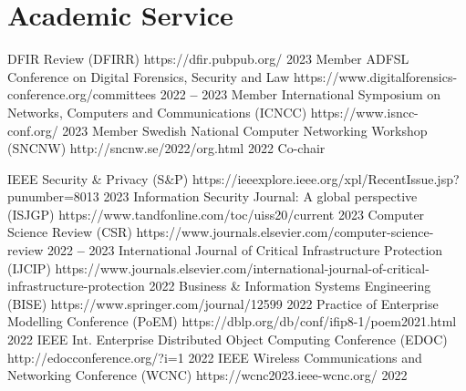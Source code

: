 
\section{Academic Service}
    
    
        
        \cvItem
            {DFIR Review (DFIRR)}
            {https://dfir.pubpub.org/}
            {2023}
            {Member}
            {}
        \cvItem
            {ADFSL Conference on Digital Forensics, Security and Law}
            {https://www.digitalforensics-conference.org/committees}
            {2022 \textbf{--} 2023}
            {Member}
            {}
        \cvItem
            {International Symposium on Networks, Computers and Communications (ICNCC)}
            {https://www.isncc-conf.org/}
            {2023}
            {Member}
            {}
        \cvItem
            {Swedish National Computer Networking Workshop (SNCNW)}
            {http://sncnw.se/2022/org.html}
            {2022}
            {Co-chair}
            {}
    
    \itemizeCVEnd

    
        
        \cvItem
            {IEEE Security \& Privacy (S\&P)}
            {https://ieeexplore.ieee.org/xpl/RecentIssue.jsp?punumber=8013}
            {2023}
            {}
            {}
        \cvItem
            {Information Security Journal: A global perspective (ISJGP)}
            {https://www.tandfonline.com/toc/uiss20/current}
            {2023}
            {}
            {}
        \cvItem
            {Computer Science Review (CSR)}
            {https://www.journals.elsevier.com/computer-science-review}
            {2022 \textbf{--} 2023}
            {}
            {}
        \cvItem
            {International Journal of Critical Infrastructure Protection (IJCIP)}
            {https://www.journals.elsevier.com/international-journal-of-critical-infrastructure-protection}
            {2022}
            {}
            {}
        \cvItem
            {Business \& Information Systems Engineering (BISE)}
            {https://www.springer.com/journal/12599}
            {2022}
            {}
            {}
        \cvItem
            {Practice of Enterprise Modelling Conference (PoEM)}
            {https://dblp.org/db/conf/ifip8-1/poem2021.html}
            {2022}
            {}
            {}
        \cvItem
            {IEEE Int. Enterprise Distributed Object Computing Conference (EDOC)}
            {http://edocconference.org/?i=1}
            {2022}
            {}
            {}
        \cvItem
            {IEEE Wireless Communications and Networking Conference (WCNC)}
            {https://wcnc2023.ieee-wcnc.org/}
            {2022}
            {}
            {}
        
